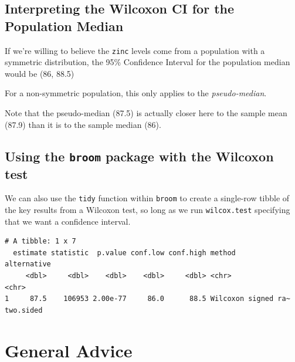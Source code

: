 \documentclass[
]{book}
\newenvironment{Shaded}{\begin{snugshade}}{\end{snugshade}}
\newcommand{\DataTypeTok}[1]{\textcolor[rgb]{0.13,0.29,0.53}{#1}}
\newcommand{\FloatTok}[1]{\textcolor[rgb]{0.00,0.00,0.81}{#1}}
\newcommand{\KeywordTok}[1]{\textcolor[rgb]{0.13,0.29,0.53}{\textbf{#1}}}
\newcommand{\NormalTok}[1]{#1}
\newcommand{\OperatorTok}[1]{\textcolor[rgb]{0.81,0.36,0.00}{\textbf{#1}}}
\newcommand{\OtherTok}[1]{\textcolor[rgb]{0.56,0.35,0.01}{#1}}
\newcommand{\StringTok}[1]{\textcolor[rgb]{0.31,0.60,0.02}{#1}}
\begin{document}
\hypertarget{interpreting-the-wilcoxon-ci-for-the-population-median}{%
\subsection{Interpreting the Wilcoxon CI for the Population Median}\label{interpreting-the-wilcoxon-ci-for-the-population-median}}

If we're willing to believe the \texttt{zinc} levels come from a population with a symmetric distribution, the 95\% Confidence Interval for the population median would be (86, 88.5)

For a non-symmetric population, this only applies to the \emph{pseudo-median}.

Note that the pseudo-median (87.5) is actually closer here to the sample mean (87.9) than it is to the sample median (86).

\hypertarget{using-the-broom-package-with-the-wilcoxon-test}{%
\subsection{\texorpdfstring{Using the \texttt{broom} package with the Wilcoxon test}{Using the broom package with the Wilcoxon test}}\label{using-the-broom-package-with-the-wilcoxon-test}}

We can also use the \texttt{tidy} function within \texttt{broom} to create a single-row tibble of the key results from a Wilcoxon test, so long as we run \texttt{wilcox.test} specifying that we want a confidence interval.

\begin{Shaded}
\end{Shaded}

\begin{verbatim}
# A tibble: 1 x 7
  estimate statistic  p.value conf.low conf.high method              alternative
     <dbl>     <dbl>    <dbl>    <dbl>     <dbl> <chr>               <chr>      
1     87.5    106953 2.00e-77     86.0      88.5 Wilcoxon signed ra~ two.sided  
\end{verbatim}

\hypertarget{general-advice}{%
\section{General Advice}\label{general-advice}}
\end{document}

